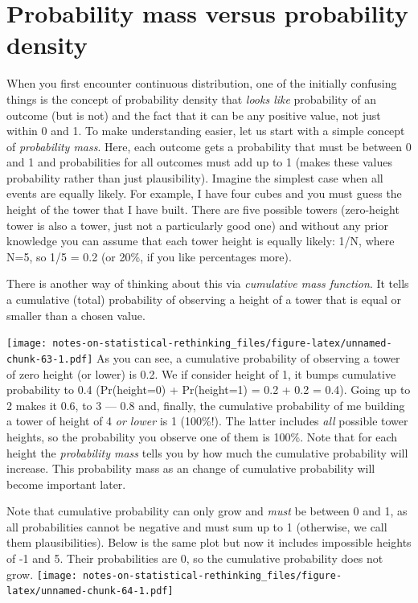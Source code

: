 \documentclass[
]{book}
\begin{document}
\hypertarget{probability-mass-versus-probability-density}{%
\chapter{Probability mass versus probability density}\label{probability-mass-versus-probability-density}}

When you first encounter continuous distribution, one of the initially confusing things is the concept of probability density that \emph{looks like} probability of an outcome (but is not) and the fact that it can be any positive value, not just within 0 and 1. To make understanding easier, let us start with a simple concept of \emph{probability mass}. Here, each outcome gets a probability that must be between 0 and 1 and probabilities for all outcomes must add up to 1 (makes these values probability rather than just plausibility). Imagine the simplest case when all events are equally likely. For example, I have four cubes and you must guess the height of the tower that I have built. There are five possible towers (zero-height tower is also a tower, just not a particularly good one) and without any prior knowledge you can assume that each tower height is equally likely: 1/N, where N=5, so 1/5 = 0.2 (or 20\%, if you like percentages more).

There is another way of thinking about this via \emph{cumulative mass function}. It tells a cumulative (total) probability of observing a height of a tower that is equal or smaller than a chosen value.

\texttt{[image: notes-on-statistical-rethinking\_files/figure-latex/unnamed-chunk-63-1.pdf]}
As you can see, a cumulative probability of observing a tower of zero height (or lower) is 0.2. We if consider height of 1, it bumps cumulative probability to 0.4 (Pr(height=0) + Pr(height=1) = 0.2 + 0.2 = 0.4). Going up to 2 makes it 0.6, to 3 --- 0.8 and, finally, the cumulative probability of me building a tower of height of 4 \emph{or lower} is 1 (100\%!). The latter includes \emph{all} possible tower heights, so the probability you observe one of them is 100\%. Note that for each height the \emph{probability mass} tells you by how much the cumulative probability will increase. This probability mass as an change of cumulative probability will become important later.

Note that cumulative probability can only grow and \emph{must} be between 0 and 1, as all probabilities cannot be negative and must sum up to 1 (otherwise, we call them plausibilities). Below is the same plot but now it includes impossible heights of -1 and 5. Their probabilities are 0, so the cumulative probability does not grow.
\texttt{[image: notes-on-statistical-rethinking\_files/figure-latex/unnamed-chunk-64-1.pdf]}
\end{document}
